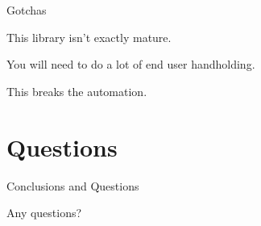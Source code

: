 \documentclass{beamer}
\begin{document}
\begin{frame}
    \LARGE Gotchas

    \normalsize
    This library isn't exactly mature.

    You will need to do a lot of end user handholding.

    This breaks the automation.

    
\end{frame}


\section{Questions}

\begin{frame}
    \LARGE Conclusions and Questions

    \normalsize
    Any questions?
\end{frame}
\end{document}
